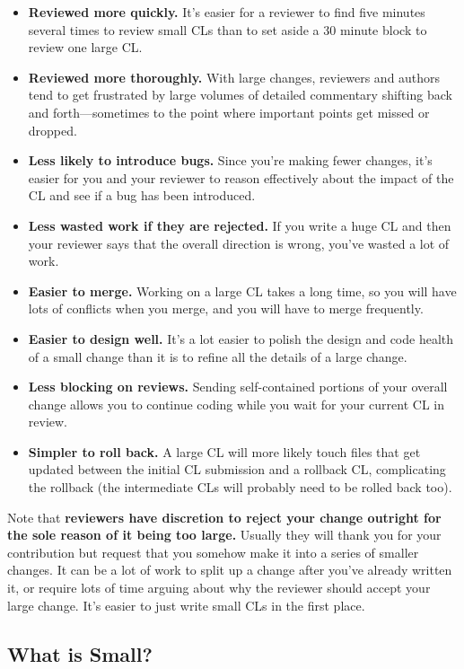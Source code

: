 \documentclass[
]{article}
\providecommand{\tightlist}{%
  \setlength{\itemsep}{0pt}\setlength{\parskip}{0pt}}
\begin{document}
\begin{itemize}
\tightlist
\item
  \textbf{Reviewed more quickly.} It's easier for a reviewer to find
  five minutes several times to review small CLs than to set aside a 30
  minute block to review one large CL.
\item
  \textbf{Reviewed more thoroughly.} With large changes, reviewers and
  authors tend to get frustrated by large volumes of detailed commentary
  shifting back and forth---sometimes to the point where important
  points get missed or dropped.
\item
  \textbf{Less likely to introduce bugs.} Since you're making fewer
  changes, it's easier for you and your reviewer to reason effectively
  about the impact of the CL and see if a bug has been introduced.
\item
  \textbf{Less wasted work if they are rejected.} If you write a huge CL
  and then your reviewer says that the overall direction is wrong,
  you've wasted a lot of work.
\item
  \textbf{Easier to merge.} Working on a large CL takes a long time, so
  you will have lots of conflicts when you merge, and you will have to
  merge frequently.
\item
  \textbf{Easier to design well.} It's a lot easier to polish the design
  and code health of a small change than it is to refine all the details
  of a large change.
\item
  \textbf{Less blocking on reviews.} Sending self-contained portions of
  your overall change allows you to continue coding while you wait for
  your current CL in review.
\item
  \textbf{Simpler to roll back.} A large CL will more likely touch files
  that get updated between the initial CL submission and a rollback CL,
  complicating the rollback (the intermediate CLs will probably need to
  be rolled back too).
\end{itemize}

Note that \textbf{reviewers have discretion to reject your change
outright for the sole reason of it being too large.} Usually they will
thank you for your contribution but request that you somehow make it
into a series of smaller changes. It can be a lot of work to split up a
change after you've already written it, or require lots of time arguing
about why the reviewer should accept your large change. It's easier to
just write small CLs in the first place.

\subsection{What is Small?}\label{what-is-small}
\end{document}
